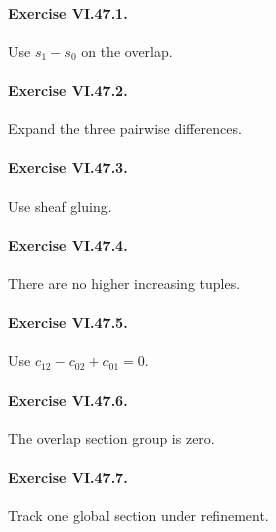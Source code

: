 \paragraph{Exercise VI.47.1.}
\begin{hint}
Use \(s_1-s_0\) on the overlap.
\end{hint}

\paragraph{Exercise VI.47.2.}
\begin{hint}
Expand the three pairwise differences.
\end{hint}

\paragraph{Exercise VI.47.3.}
\begin{hint}
Use sheaf gluing.
\end{hint}

\paragraph{Exercise VI.47.4.}
\begin{hint}
There are no higher increasing tuples.
\end{hint}

\paragraph{Exercise VI.47.5.}
\begin{hint}
Use \(c_{12}-c_{02}+c_{01}=0\).
\end{hint}

\paragraph{Exercise VI.47.6.}
\begin{hint}
The overlap section group is zero.
\end{hint}

\paragraph{Exercise VI.47.7.}
\begin{hint}
Track one global section under refinement.
\end{hint}

